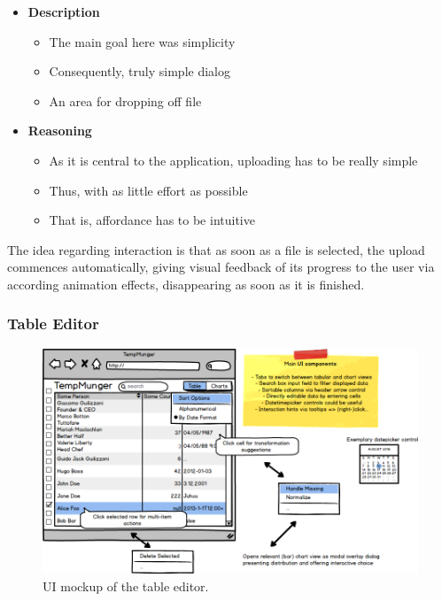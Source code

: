 \begin{itemize}
  \item \textbf{Description}
  \begin{itemize}
    \item The main goal here was simplicity
    \item Consequently, truly simple dialog
    \item An area for dropping off file
  \end{itemize}
  \item \textbf{Reasoning}
  \begin{itemize}
    \item As it is central to the application, uploading has to be really simple
    \item Thus, with as little effort as possible
    \item That is, affordance has to be intuitive
  \end{itemize}
\end{itemize}

The idea regarding interaction is that as soon as a file is selected, the upload commences automatically, giving visual feedback of its progress to the user via according animation effects, disappearing as soon as it is finished.


\subsubsection{Table Editor}

\begin{figure}[h]
  \centering
  \includegraphics[width=1.2\textwidth]{figures/design/mockup-1}
  \caption{UI mockup of the table editor.}
  \label{fig:mockup-1}
\end{figure}

